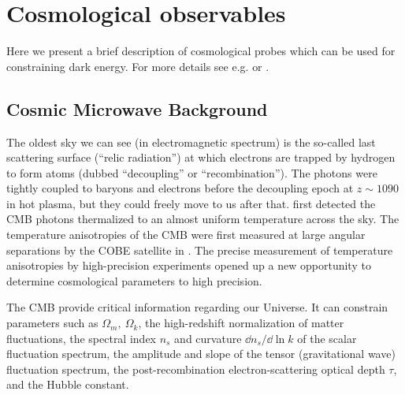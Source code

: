 \section{Cosmological observables}
Here we present a brief description of cosmological probes which can be used for constraining dark energy. For more details see e.g. \textcite{weinberg_observational_2013} or \textcite{DE_probes2}.



\subsection{Cosmic Microwave Background}
The oldest sky we can see (in electromagnetic spectrum) is the so-called last scattering surface (``relic radiation'') at which electrons are trapped by hydrogen to form atoms (dubbed ``decoupling'' or ``recombination''). The photons were tightly coupled to baryons and electrons before the decoupling epoch at $z\sim1090$ in hot plasma, but they could freely move to us after that. \textcite{1965ApJ...142..419P} first detected the CMB photons thermalized to an almost uniform temperature across the sky. The temperature anisotropies of the CMB were first measured at large angular separations by the COBE satellite in \textcite{1992ApJ...396L...1S}. The precise measurement of temperature anisotropies by high-precision experiments \parencite[e.g.][]{2003ApJS..148..175S} opened up a new opportunity to determine cosmological parameters to high precision.

The CMB provide critical information regarding our Universe. It can constrain parameters such as $\Omega_m,\ \Omega_k$, the high-redshift normalization of matter fluctuations, the spectral index $n_s$ and curvature $\dd n_s/\dd \ln k$ of the scalar fluctuation spectrum, the amplitude and slope of the tensor (gravitational wave) fluctuation spectrum, the post-recombination electron-scattering optical depth $\tau$, and the Hubble constant.

